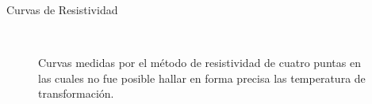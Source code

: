 \documentclass[11pt]{beamer}
\begin{document}
		\begin{frame}{Curvas de Resistividad}
			\begin{figure}[H]
			\captionsetup[subfloat]{labelformat=empty}
				\centering
				 \qquad
				\\
				\caption*{Curvas medidas por el método de resistividad de cuatro puntas en las cuales no fue posible hallar en forma precisa las temperatura de transformación.}
			\end{figure}
		\end{frame}
		
\end{document}
